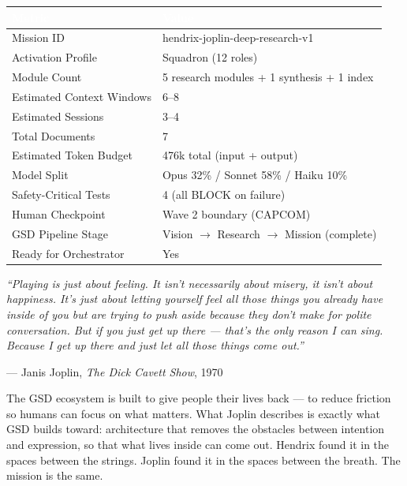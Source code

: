 \documentclass[11pt,letterpaper]{article}
\newcommand{\tableheader}[1]{\textbf{\sffamily\textcolor{white}{#1}}}
\begin{document}
\begin{center}
\begin{tabularx}{\textwidth}{L{4cm}X}
\toprule
{}
\tableheader{Metric} & \tableheader{Value} \\
\midrule
Mission ID & hendrix-joplin-deep-research-v1 \\
Activation Profile & Squadron (12 roles) \\
Module Count & 5 research modules + 1 synthesis + 1 index \\
Estimated Context Windows & 6--8 \\
Estimated Sessions & 3--4 \\
Total Documents & 7 \\
Estimated Token Budget & 476k total (input + output) \\
Model Split & Opus 32\% / Sonnet 58\% / Haiku 10\% \\
Safety-Critical Tests & 4 (all BLOCK on failure) \\
Human Checkpoint & Wave 2 boundary (CAPCOM) \\
GSD Pipeline Stage & Vision $\rightarrow$ Research $\rightarrow$ Mission (complete) \\
Ready for Orchestrator & Yes \\
\bottomrule
\end{tabularx}
\end{center}

\vspace{2em}

\begin{quotebox}
\textit{``Playing is just about feeling. It isn't necessarily about misery, it isn't about happiness. It's just about letting yourself feel all those things you already have inside of you but are trying to push aside because they don't make for polite conversation. But if you just get up there --- that's the only reason I can sing. Because I get up there and just let all those things come out.''}

\vspace{0.5em}
\hfill --- Janis Joplin, \textit{The Dick Cavett Show}, 1970

\vspace{1em}
The GSD ecosystem is built to give people their lives back --- to reduce friction so humans can focus on what matters. What Joplin describes is exactly what GSD builds toward: architecture that removes the obstacles between intention and expression, so that what lives inside can come out. Hendrix found it in the spaces between the strings. Joplin found it in the spaces between the breath. The mission is the same.
\end{quotebox}
\end{document}
